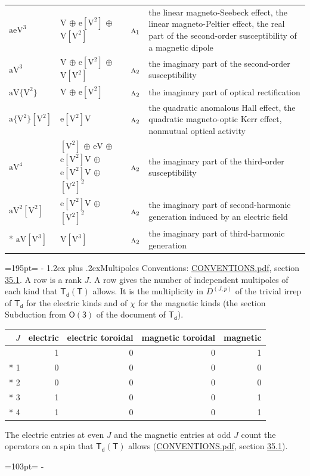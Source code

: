 \documentclass[10pt,a4paper]{article}
\makeatletter
\renewcommand\section{\@startsection{section}{1}{\z@}{-3ex plus -1ex minus -.2ex}%
  {1.2ex plus .2ex}{\normalfont\large\sffamily\bfseries\color{parttitle}}}
\newcommand{\needspace}[1]{\par\penalty-100\begingroup\dimen0=#1\relax\dimen2=\pagegoal
  \advance\dimen2-\pagetotal\ifdim\dimen0>\dimen2\relax\ifdim\dimen2>0pt\vfil\break\fi\fi
  \endgroup}
\numberwithin{equation}{section}
\newcommand{\grp}[1]{\mathsf{#1}}
\newcommand{\irr}[1]{\text{\normalfont\scshape #1}}
\newcommand{\irrJp}[2]{D^{(#1,#2)}}
\newcommand{\jahn}[1]{\mathrm{#1}}
\newlength{\fillwidth}\newlength{\cellwidth}\newlength{\colwidth}
\makeatother
\begin{document}
{\begin{longtable}{@{}lll>{\RaggedRight\arraybackslash}p{\fillwidth}@{}}
$\jahn{aeV^{3}}$ & $\jahn{V}$ $\oplus$ $\jahn{e[V^{2}]}$ $\oplus$ $\jahn{V[V^{2}]}$ & $\irr{a}_{1}$ & the linear magneto-Seebeck effect, the linear magneto-Peltier effect, the real part of the second-order susceptibility of a magnetic dipole\\
$\jahn{aV^{3}}$ & $\jahn{V}$ $\oplus$ $\jahn{e[V^{2}]}$ $\oplus$ $\jahn{V[V^{2}]}$ & $\irr{a}_{2}$ & the imaginary part of the second-order susceptibility\\
$\jahn{aV\{V^{2}\}}$ & $\jahn{V}$ $\oplus$ $\jahn{e[V^{2}]}$ & $\irr{a}_{2}$ & the imaginary part of optical rectification\\
$\jahn{a\{V^{2}\}[V^{2}]}$ & $\jahn{e[V^{2}]V}$ & $\irr{a}_{2}$ & the quadratic anomalous Hall effect, the quadratic magneto-optic Kerr effect, nonmutual optical activity\\
$\jahn{aV^{4}}$ & $\jahn{[V^{2}]}$ $\oplus$ $\jahn{eV}$ $\oplus$ $\jahn{e[V^{2}]V}$ $\oplus$ $\jahn{e[V^{2}]V}$ $\oplus$ $\jahn{[V^{2}]^{2}}$ & $\irr{a}_{2}$ & the imaginary part of the third-order susceptibility\\
$\jahn{aV^{2}[V^{2}]}$ & $\jahn{e[V^{2}]V}$ $\oplus$ $\jahn{[V^{2}]^{2}}$ & $\irr{a}_{2}$ & the imaginary part of second-harmonic generation induced by an electric field\\*
$\jahn{aV[V^{3}]}$ & $\jahn{V[V^{3}]}$ & $\irr{a}_{2}$ & the imaginary part of third-harmonic generation\\
\bottomrule\end{longtable}}
\needspace{195pt}
\section{Multipoles}\label{s:multipoles}
Conventions: \href{../../CONVENTIONS.pdf}{CONVENTIONS.pdf}, section \href{../../CONVENTIONS.pdf\#conv.35.1}{35.1}.
A row is a rank $J$. \label{n:head.multipole.electric}\label{n:head.multipole.electric.toroidal}\label{n:head.multipole.magnetic.toroidal}\label{n:head.multipole.magnetic}A row gives the number of independent multipoles of each kind that $\grp{T_{d}}(\grp{T})$ allows. It is the multiplicity in $\irrJp{J}{p}$ of the trivial irrep of $\grp{T_{d}}$ for the electric kinds and of $\chi$ for the magnetic kinds (the section Subduction from $\grp{O(3)}$ of the document of \href{../../../rotation/data/pdf/Td.pdf}{$\grp{T_{d}}$}).
{\small\begin{longtable}{@{}rrrrr@{}}\toprule
$J$ & electric & electric toroidal & magnetic toroidal & magnetic\\\midrule\endhead
\bottomrule\endfoot\endlastfoot
0 & 1 & 0 & 0 & 1\\*
1 & 0 & 0 & 0 & 0\\*
2 & 0 & 0 & 0 & 0\\*
3 & 1 & 0 & 0 & 1\\*
4 & 1 & 0 & 0 & 1\\
\bottomrule\end{longtable}}
The electric entries at even $J$ and the magnetic entries at odd $J$ count the operators on a spin that $\grp{T_{d}}(\grp{T})$ allows (\href{../../CONVENTIONS.pdf}{CONVENTIONS.pdf}, section \href{../../CONVENTIONS.pdf\#conv.35.1}{35.1}).
\needspace{103pt}
\end{document}
